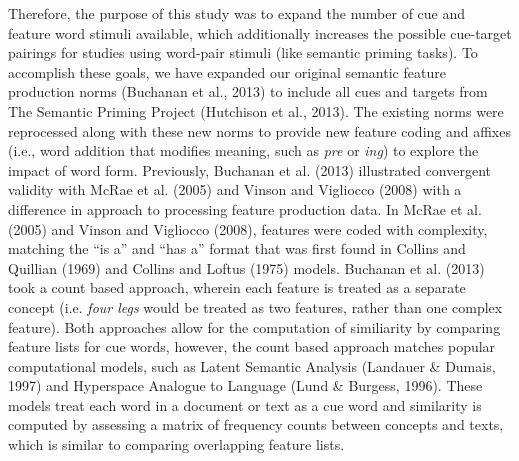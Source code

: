 \documentclass[english,,man]{apa6}
\theoremstyle{definition}
\theoremstyle{definition}
\theoremstyle{definition}
\theoremstyle{remark}
\begin{document}
Therefore, the purpose of this study was to expand the number of cue and
feature word stimuli available, which additionally increases the
possible cue-target pairings for studies using word-pair stimuli (like
semantic priming tasks). To accomplish these goals, we have expanded our
original semantic feature production norms (Buchanan et al., 2013) to
include all cues and targets from The Semantic Priming Project
(Hutchison et al., 2013). The existing norms were reprocessed along with
these new norms to provide new feature coding and affixes (i.e., word
addition that modifies meaning, such as \emph{pre} or \emph{ing}) to
explore the impact of word form. Previously, Buchanan et al. (2013)
illustrated convergent validity with McRae et al. (2005) and Vinson and
Vigliocco (2008) with a difference in approach to processing feature
production data. In McRae et al. (2005) and Vinson and Vigliocco (2008),
features were coded with complexity, matching the \enquote{is a} and
\enquote{has a} format that was first found in Collins and Quillian
(1969) and Collins and Loftus (1975) models. Buchanan et al. (2013) took
a count based approach, wherein each feature is treated as a separate
concept (i.e. \emph{four legs} would be treated as two features, rather
than one complex feature). Both approaches allow for the computation of
similiarity by comparing feature lists for cue words, however, the count
based approach matches popular computational models, such as Latent
Semantic Analysis (Landauer \& Dumais, 1997) and Hyperspace Analogue to
Language (Lund \& Burgess, 1996). These models treat each word in a
document or text as a cue word and similarity is computed by assessing a
matrix of frequency counts between concepts and texts, which is similar
to comparing overlapping feature lists.
\end{document}

